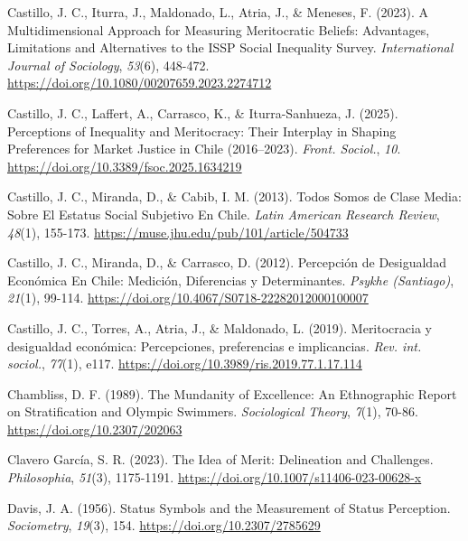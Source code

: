 \documentclass[
  spanish,
  a4paper,
  oneside]{scrbook}
\newlength{\cslhangindent}
\newenvironment{CSLReferences}[2] %
 {\begin{list}{}{%
  \setlength{\itemindent}{0pt}
  \setlength{\leftmargin}{0pt}
  \setlength{\parsep}{0pt}
  \ifodd #1
   \setlength{\leftmargin}{\cslhangindent}
   \setlength{\itemindent}{-1\cslhangindent}
  \fi
  \setlength{\itemsep}{#2\baselineskip}}}
 {\end{list}}
\begin{document}
\begin{CSLReferences}{1}{0}
Castillo, J. C., Iturra, J., Maldonado, L., Atria, J., \& Meneses, F.
(2023). A {Multidimensional Approach} for {Measuring Meritocratic
Beliefs}: {Advantages}, {Limitations} and {Alternatives} to the {ISSP
Social Inequality Survey}. \emph{International Journal of Sociology},
\emph{53}(6), 448-472.
\url{https://doi.org/10.1080/00207659.2023.2274712}

Castillo, J. C., Laffert, A., Carrasco, K., \& Iturra-Sanhueza, J.
(2025). Perceptions of Inequality and Meritocracy: Their Interplay in
Shaping Preferences for Market Justice in {Chile} (2016--2023).
\emph{Front. Sociol.}, \emph{10}.
\url{https://doi.org/10.3389/fsoc.2025.1634219}

Castillo, J. C., Miranda, D., \& Cabib, I. M. (2013). Todos Somos de
Clase Media: {Sobre} El Estatus Social Subjetivo En {Chile}. \emph{Latin
American Research Review}, \emph{48}(1), 155-173.
\url{https://muse.jhu.edu/pub/101/article/504733}

Castillo, J. C., Miranda, D., \& Carrasco, D. (2012). Percepción de
{Desigualdad Económica} En {Chile}: {Medición}, {Diferencias} y
{Determinantes}. \emph{Psykhe (Santiago)}, \emph{21}(1), 99-114.
\url{https://doi.org/10.4067/S0718-22282012000100007}

Castillo, J. C., Torres, A., Atria, J., \& Maldonado, L. (2019).
{Meritocracia y desigualdad económica: Percepciones, preferencias e
implicancias}. \emph{Rev. int. sociol.}, \emph{77}(1), e117.
\url{https://doi.org/10.3989/ris.2019.77.1.17.114}

Chambliss, D. F. (1989). The {Mundanity} of {Excellence}: {An
Ethnographic Report} on {Stratification} and {Olympic Swimmers}.
\emph{Sociological Theory}, \emph{7}(1), 70-86.
\url{https://doi.org/10.2307/202063}

Clavero García, S. R. (2023). The {Idea} of {Merit}: {Delineation} and
{Challenges}. \emph{Philosophia}, \emph{51}(3), 1175-1191.
\url{https://doi.org/10.1007/s11406-023-00628-x}

Davis, J. A. (1956). Status {Symbols} and the {Measurement} of {Status
Perception}. \emph{Sociometry}, \emph{19}(3), 154.
\url{https://doi.org/10.2307/2785629}


\end{CSLReferences}
\end{document}
